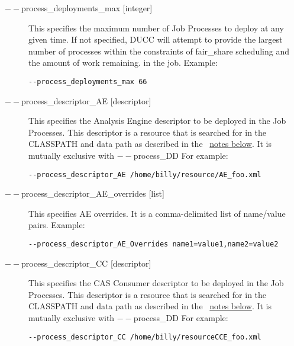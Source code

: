 \begin{description}
           \item[$--$process\_deployments\_max {[integer]} ]

             This specifies the maximum number of Job Processes to deploy at any given time. If not 
             specified, DUCC will attempt to provide the largest number of processes within the 
             constraints of fair\_share scheduling and the amount of work remaining.
             in the job. Example:
             \begin{verbatim}
--process_deployments_max 66 
             \end{verbatim}


           \item[$--$process\_descriptor\_AE {[descriptor]}  ]

             This specifies the Analysis Engine descriptor to be deployed in the Job Processes. This 
             descriptor is a resource that is searched for in the CLASSPATH and data path as described 
             in the ~\hyperref[par:cli.submit.notes]{notes below}.
             It is mutually exclusive with $--$process\_DD For example: 
             \begin{verbatim}
--process_descriptor_AE /home/billy/resource/AE_foo.xml 
             \end{verbatim}


           \item[$--$process\_descriptor\_AE\_overrides {[list]}  ]

             This specifies AE overrides. It is a comma-delimited list of name/value pairs. Example: 
             \begin{verbatim}
--process_descriptor_AE_Overrides name1=value1,name2=value2 
             \end{verbatim}
             
           \item[$--$process\_descriptor\_CC {[descriptor]}  ]

             This specifies the CAS Consumer descriptor to be deployed in the Job Processes. This 
             descriptor is a resource that is searched for in the CLASSPATH and data path as described 
             in the ~\hyperref[par:cli.submit.notes]{notes below}.
             It is mutually exclusive with $--$process\_DD For example: 
             \begin{verbatim}
--process_descriptor_CC /home/billy/resourceCCE_foo.xml 
             \end{verbatim}
             

\end{description}
